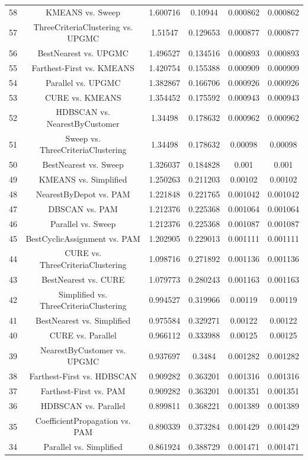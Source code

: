 \documentclass[a4paper,10pt]{article}
\begin{document}
\begin{landscape}
\begin{table}[!htp]
\begin{tabular}{cccccc}
58&KMEANS vs. Sweep&1.600716&0.10944&0.000862&0.000862\\
57&ThreeCriteriaClustering vs. UPGMC&1.51547&0.129653&0.000877&0.000877\\
56&BestNearest vs. UPGMC&1.496527&0.134516&0.000893&0.000893\\
55&Farthest-First vs. KMEANS&1.420754&0.155388&0.000909&0.000909\\
54&Parallel vs. UPGMC&1.382867&0.166706&0.000926&0.000926\\
53&CURE vs. KMEANS&1.354452&0.175592&0.000943&0.000943\\
52&HDBSCAN vs. NearestByCustomer&1.34498&0.178632&0.000962&0.000962\\
51&Sweep vs. ThreeCriteriaClustering&1.34498&0.178632&0.00098&0.00098\\
50&BestNearest vs. Sweep&1.326037&0.184828&0.001&0.001\\
49&KMEANS vs. Simplified&1.250263&0.211203&0.00102&0.00102\\
48&NearestByDepot vs. PAM&1.221848&0.221765&0.001042&0.001042\\
47&DBSCAN vs. PAM&1.212376&0.225368&0.001064&0.001064\\
46&Parallel vs. Sweep&1.212376&0.225368&0.001087&0.001087\\
45&BestCyclicAssignment vs. PAM&1.202905&0.229013&0.001111&0.001111\\
44&CURE vs. ThreeCriteriaClustering&1.098716&0.271892&0.001136&0.001136\\
43&BestNearest vs. CURE&1.079773&0.280243&0.001163&0.001163\\
42&Simplified vs. ThreeCriteriaClustering&0.994527&0.319966&0.00119&0.00119\\
41&BestNearest vs. Simplified&0.975584&0.329271&0.00122&0.00122\\
40&CURE vs. Parallel&0.966112&0.333988&0.00125&0.00125\\
39&NearestByCustomer vs. UPGMC&0.937697&0.3484&0.001282&0.001282\\
38&Farthest-First vs. HDBSCAN&0.909282&0.363201&0.001316&0.001316\\
37&Farthest-First vs. PAM&0.909282&0.363201&0.001351&0.001351\\
36&HDBSCAN vs. Parallel&0.899811&0.368221&0.001389&0.001389\\
35&CoefficientPropagation vs. PAM&0.890339&0.373284&0.001429&0.001429\\
34&Parallel vs. Simplified&0.861924&0.388729&0.001471&0.001471\\

\end{tabular}
\end{table}
\end{landscape}
\end{document}
